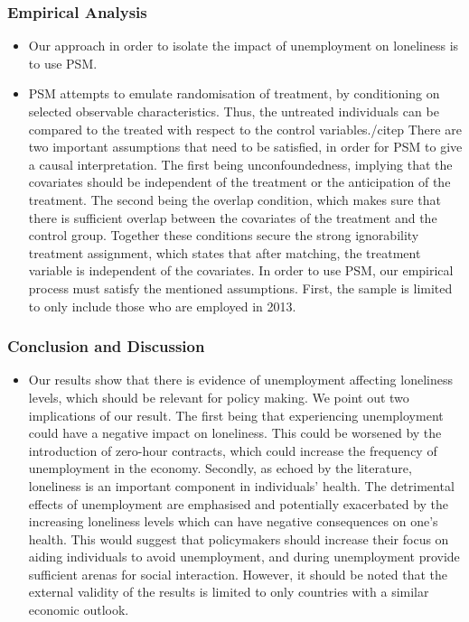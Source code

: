 \documentclass[11pt, aspectratio=169]{beamer}
\begin{document}
\begin{frame}[t]
    \frametitle{Empirical Analysis}
     \begin{itemize}
          \item Our approach in order to isolate the impact of unemployment on loneliness is to use PSM.\@
          \item PSM attempts to emulate randomisation of treatment, by conditioning on selected observable characteristics. Thus, the untreated individuals can be compared to the treated with
            respect to the control variables./citep
            There are two important assumptions that need to be satisfied, in order for PSM to
            give a causal interpretation. The first being unconfoundedness,
            implying that the covariates should be independent of the treatment or the anticipation
            of the treatment. The second being the overlap condition, which makes sure that there is
            sufficient overlap between the covariates of the treatment and the control group. Together
            these conditions secure the strong ignorability treatment assignment, which states that
            after matching, the treatment variable is independent of the covariates.
            In order to use PSM, our empirical process must satisfy the mentioned assumptions.
            First, the sample is limited to only include those who are employed in 2013.
     \end{itemize}
    \note{~}
\end{frame}

\begin{frame}[t]
    \frametitle{Conclusion and Discussion}
    \begin{itemize}
        \item Our results show that there is evidence of unemployment affecting loneliness levels, which
        should be relevant for policy making. We point out two implications of our result. The first
        being that experiencing unemployment could have a negative impact on loneliness. This
        could be worsened by the introduction of zero-hour contracts, which could increase the frequency of unemployment in the economy. Secondly, as echoed by the literature, loneliness
        is an important component in individuals' health. The detrimental effects of unemployment
        are emphasised and potentially exacerbated by the increasing loneliness levels which can
        have negative consequences on one's health. This would suggest that policymakers should
        increase their focus on aiding individuals to avoid unemployment, and during unemployment provide sufficient arenas for social interaction. However, it should be noted that the
        external validity of the results is limited to only countries with a similar economic outlook.
    \end{itemize}
    \note{~}
\end{frame}
\end{document}
